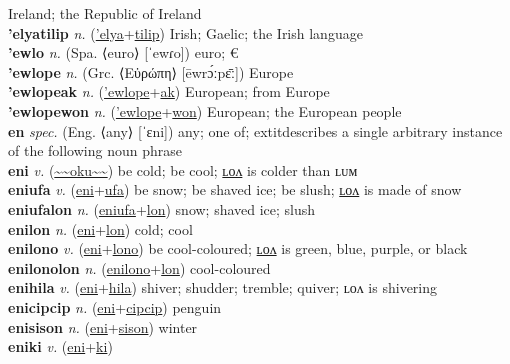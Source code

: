 Ireland; the Republic of Ireland \label{'elyatec} \\
\textbf{'elyatilip} \textit{n.} (\hyperref['elya]{'elya}+\hyperref[tilip]{tilip})
Irish; Gaelic; the Irish language \label{'elyatilip} \\
\textbf{'ewlo} \textit{n.} (Spa. ⟨euro⟩ [ˈewɾo])
euro; € \label{'ewlo} \\
\textbf{'ewlope} \textit{n.} (Grc. ⟨Εὐρώπη⟩ [ēwrɔ́ːpɛ̄ː])
Europe \label{'ewlope} \\
\textbf{'ewlopeak} \textit{n.} (\hyperref['ewlope]{'ewlope}+\hyperref[ak]{ak})
European; from Europe \label{'ewlopeak} \\
\textbf{'ewlopewon} \textit{n.} (\hyperref['ewlope]{'ewlope}+\hyperref[won]{won})
European; the European people \label{'ewlopewon} \\
\textbf{en} \textit{spec.} (Eng. ⟨any⟩ [ˈɛni])
any; one of; 	extit{describes a single arbitrary instance of the following noun phrase} \label{en} \\
\textbf{eni} \textit{v.} (\hyperref[oku]{\~{}\~{}oku\~{}\~{}})
be cold; be cool; \hyperref[enilon]{ʟᴏᴧ} is colder than ʟᴜᴍ \label{eni} \\
\textbf{eniufa} \textit{v.} (\hyperref[eni]{eni}+\hyperref[ufa]{ufa})
be snow; be shaved ice; be slush; \hyperref[eniufalon]{ʟᴏᴧ} is made of snow \label{eniufa} \\
\textbf{eniufalon} \textit{n.} (\hyperref[eniufa]{eniufa}+\hyperref[lon]{lon})
snow; shaved ice; slush \label{eniufalon} \\
\textbf{enilon} \textit{n.} (\hyperref[eni]{eni}+\hyperref[lon]{lon})
cold; cool \label{enilon} \\
\textbf{enilono} \textit{v.} (\hyperref[eni]{eni}+\hyperref[lono]{lono})
be cool-coloured; \hyperref[enilonolon]{ʟᴏᴧ} is green, blue, purple, or black \label{enilono} \\
\textbf{enilonolon} \textit{n.} (\hyperref[enilono]{enilono}+\hyperref[lon]{lon})
cool-coloured \label{enilonolon} \\
\textbf{enihila} \textit{v.} (\hyperref[eni]{eni}+\hyperref[hila]{hila})
shiver; shudder; tremble; quiver; ʟᴏᴧ is shivering \label{enihila} \\
\textbf{enicipcip} \textit{n.} (\hyperref[eni]{eni}+\hyperref[cipcip]{cipcip})
penguin \label{enicipcip} \\
\textbf{enisison} \textit{n.} (\hyperref[eni]{eni}+\hyperref[sison]{sison})
winter \label{enisison} \\
\textbf{eniki} \textit{v.} (\hyperref[eni]{eni}+\hyperref[ki]{ki})
